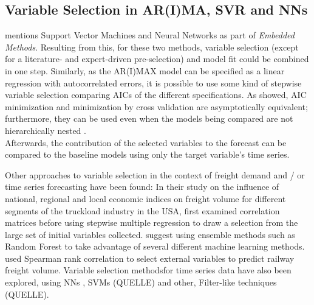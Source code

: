 \documentclass[a4paper, 11pt]{article}
\begin{document}
\subsection{Variable Selection in AR(I)MA, SVR and NNs}
\cite{Chandrashekar.2014} mentions Support Vector Machines and Neural Networks as part of \textit{Embedded Methods}. Resulting from this, for these two methods, variable selection (except for a literature- and expert-driven pre-selection) and model fit could be combined in one step. 
Similarly, as the AR(I)MAX model can be specified as a linear regression with autocorrelated errors, it is possible to use some kind of stepwise variable selection comparing AICs of the different specifications. As \cite{Stone.1977} showed, AIC minimization and minimization by cross validation are asymptotically equivalent; furthermore,  they can be used even when the models being compared are not hierarchically nested \citep{Heinze.2018}. \\
Afterwards, the contribution of the selected variables to the forecast can be compared to the baseline models using only the target variable's time series. 

Other approaches to variable selection in the context of freight demand and / or time series forecasting have been found:
In their study on the influence of national, regional and local economic indices on freight volume for different segments of the truckload industry in the USA, \cite{Fite.2002} first examined correlation matrices before using stepwise multiple regression to draw a selection from the large set of initial variables collected. 
\cite{Taghizadeh.2017} suggest using ensemble methods such as Random Forest to take advantage of several different machine learning methods.
\cite{Feng.2018} used Spearman rank correlation to select external variables to predict railway freight volume.
Variable selection methodsfor time series data have also been explored, using NNs \citep{Crone.2010}, SVMs (QUELLE) and other, Filter-like techniques (QUELLE).\\
\end{document}
